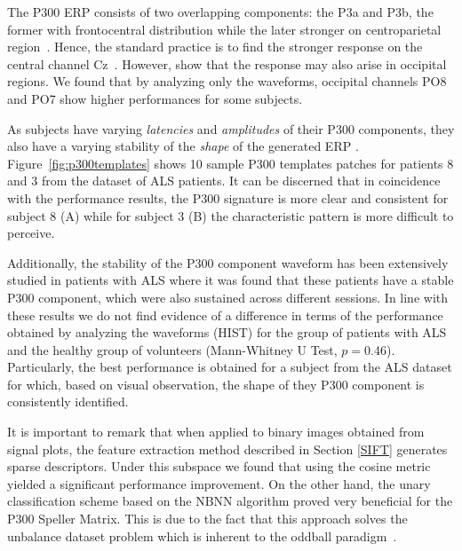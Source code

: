 \documentclass[utf8]{frontiersSCNS} %
\begin{document}
The P300 ERP  consists of two overlapping components: the P3a and P3b, the former with frontocentral distribution while the later stronger on centroparietal region~\citep{Polich2007}. Hence, the standard practice is to find the stronger response on the central channel Cz~\citep{Riccio2013}. However, \cite{Krusienski2006} show that the response may also arise in occipital regions.  We found that by analyzing only the waveforms, occipital channels PO8 and PO7 show higher performances for some subjects. 


As subjects have varying \textit{latencies} and \textit{amplitudes} of their P300 components, they also have a varying stability of the \textit{shape} of the generated ERP \citep{Nam2010}.  Figure~\ref{fig:p300templates} shows 10 sample P300 templates patches for patients 8 and 3 from the dataset of ALS patients. It can be discerned that in coincidence with the performance results, the P300 signature is more clear and consistent for subject 8 (A) while for subject 3 (B) the characteristic pattern is more difficult to perceive.

Additionally, the stability of the P300 component waveform has been extensively studied in patients with ALS \citep{SellersandEmanuelDonchin2006,TomohiroMadarame2008,Nijboer2009,Mak2012,McCane2015} where it was found that these patients have a stable P300 component, which were also sustained across different sessions.  In line with these results we do not find evidence of a difference in terms of the performance obtained by analyzing the waveforms (HIST) for the group of patients with ALS and the healthy group of volunteers (Mann-Whitney U Test, $p=0.46$). Particularly, the best performance is obtained for a subject from the ALS dataset for which, based on visual observation, the shape of they P300 component is consistently identified.


It is important to remark that when applied to binary images obtained from signal plots, the feature extraction method described in Section \ref{SIFT} generates sparse descriptors.  Under this subspace we found that using the cosine metric yielded a significant performance improvement. On the other hand, the unary classification scheme based on the NBNN algorithm proved very beneficial for the P300 Speller Matrix.  This is due to the fact that this approach solves the unbalance dataset problem which is inherent to the oddball paradigm~\citep{Tibon2015}.  
\end{document}
